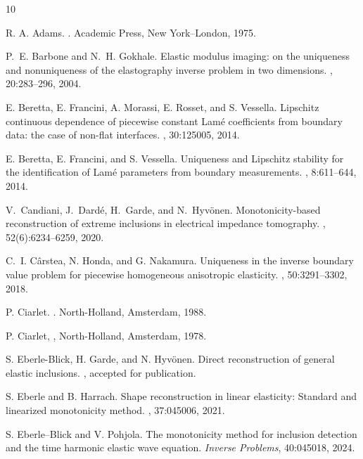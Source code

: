 \documentclass[reqno]{amsart}
\numberwithin{equation}{section}
\numberwithin{figure}{section}
\numberwithin{table}{section}
\theoremstyle{definition}
\theoremstyle{plain}
\theoremstyle{definition}
\theoremstyle{remark}
\numberwithin{equation}{section}
\begin{document}
\begin{thebibliography}{10}

R. A. Adams. 
. 
\newblock Academic Press, New York--London, 1975.

P.~E. Barbone and  N.~H. Gokhale.
\newblock Elastic modulus imaging: on the uniqueness and nonuniqueness of the elastography inverse problem in two dimensions.
, 20:283--296, 2004.

E. Beretta, E. Francini, A. Morassi, E. Rosset, and S. Vessella.
\newblock Lipschitz continuous dependence of piecewise constant {L}am\'e coefficients from boundary data: the case of non-flat interfaces.
, 30:125005, 2014.

E. Beretta, E. Francini, and S. Vessella.
\newblock Uniqueness and Lipschitz stability for the identification of {L}am\'e parameters from boundary measurements.
, 8:611--644, 2014.

V.~Candiani, J.~Dard\'e, H.~Garde, and N.~Hyv{\"o}nen.
\newblock Monotonicity-based reconstruction of extreme inclusions in electrical impedance tomography.
, 52(6):6234--6259, 2020.

C.~I. C\^{a}rstea, N. Honda, and G. Nakamura.
\newblock Uniqueness in the inverse boundary value problem for piecewise homogeneous anisotropic elasticity.
, 50:3291--3302, 2018.
  
P. Ciarlet.
.
\newblock North-Holland, Amsterdam, 1988.

P. Ciarlet,
,
\newblock North-Holland, Amsterdam, 1978.

S. Eberle-Blick, H. Garde, and N. Hyv\"onen.
\newblock Direct reconstruction of general elastic inclusions.
, accepted for publication.

S. Eberle and B. Harrach. 
\newblock Shape reconstruction in linear elasticity: Standard and linearized monotonicity method.
, 37:045006, 2021.

S. Eberle--Blick and V. Pohjola.
\newblock The monotonicity method for inclusion detection and the time harmonic elastic wave equation.
\newblock \textit{Inverse Problems}, 40:045018, 2024.


\end{thebibliography}
\end{document}
